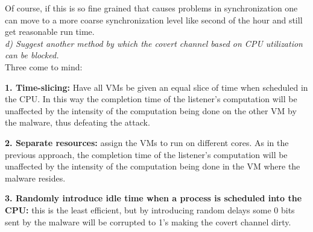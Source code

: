 Of course, if this is so fine grained that causes problems in synchronization one can move to a more coarse synchronization level like second of the hour and still get reasonable run time.\\

\noindent \textit{d) Suggest another method by which the covert channel based on CPU utilization can be blocked.}\\

\noindent Three come to mind: 

\noindent \textbf{1. Time-slicing: }Have all VMs be given an equal slice of time when scheduled in the CPU. In this way the completion time of the listener's computation will be unaffected by the intensity of the computation being done on the other VM by the malware, thus defeating the attack. 

\noindent \textbf{2. Separate resources: }assign the VMs to run on different cores. As in the previous approach, the completion time of the listener's computation will be unaffected by the intensity of the computation being done in the VM where the malware resides.

\noindent \textbf{3. Randomly introduce idle time when a process is scheduled into the CPU: }this is the least efficient, but by introducing random delays some 0 bits sent by the malware will be corrupted to 1's making the covert channel dirty.
